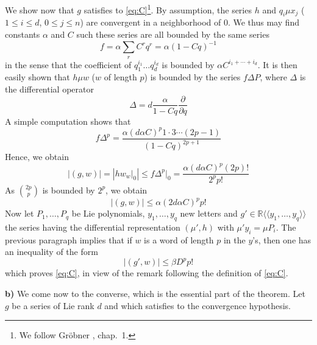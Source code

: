 \documentclass[a4paper,12pt]{article}
\newcommand{\R}{\mathbb{R}}
\begin{document}
We show now that $g$ satisfies to \eqref{eq:C}\footnote{We follow Gröbner \cite{6}, chap.\ 1.}. By assumption, the series $h$ and $q_i \mu x_j$ ($1 \leq i \leq d$, $0 \leq j \leq n$) are convergent in a neighborhood of $0$. We thus may find constants $\alpha$ and $C$ such these series are all bounded by the same series
\begin{equation*}
	f=\alpha \sum_r C^r q^r=\alpha(1-C q)^{-1}
\end{equation*}
in the sense that the coefficient of $q_1^{i_1} \ldots q_d^{i_d}$ is bounded by $\alpha C^{i_1 + \dotsb + i_d}$.
It is then easily shown that $h\mu w$ ($w$ of length $p$) is bounded by the series $f \Delta P$, where $\Delta$ is the differential operator
\begin{equation*}
	\Delta={d} \frac{\alpha}{1-{Cq}} \frac{\partial}{\partial {q}}
\end{equation*}
A simple computation shows that
\begin{equation*}
	f \Delta^p=\frac{\alpha(d \alpha C)^p 1 \cdot 3 \dotsb (2 p-1)}{(1-C q)^{2 p+1}}
\end{equation*}
Hence, we obtain
\begin{equation*}
	|(g, w)|=\left|h w_w\rvert_0\right| \leq f \Delta^p\rvert_0
	=\frac{\alpha(d \alpha C)^p(2 p) !}{2^p p !}
\end{equation*}
As ${2p}\choose{p}$ is bounded by $2^{{p}}$, we obtain
\begin{equation*}
	|(g, w)| \leq \alpha(2 d\alpha {C})^{{p}} {p}!
\end{equation*}
Now let ${P}_1, \ldots, P_q$ be Lie polynomials, ${y}_1, \ldots, {y}_{{q}}$ new letters and $g' \in \R\langle\langle{y}_1, \ldots, {y}_{{q}}\rangle\rangle$ the series having the differential representation $(\mu',h)$ with $\mu' {y}_i=\mu {P}_i$. The previous paragraph implies that if $w$ is a word of length ${p}$ in the $y$'s, then one has an inequality of the form
\begin{equation*}
	\left|(g', w)\right| \leq \beta D^p p !
\end{equation*}
which proves \eqref{eq:C}, in view of the remark following the definition of \eqref{eq:C}.

\bigskip

\textbf{b)} We come now to the converse, which is the essential part of the theorem. Let $g$ be a series of Lie rank $d$ and which satisfies to the convergence hypothesis.
\end{document}
